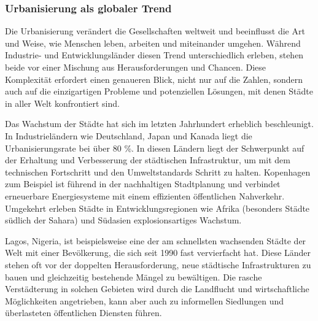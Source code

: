 \documentclass[conference,compsoc,final,a4paper, onecolumn, 11pt]{IEEEtran}
\begin{document}
\subsubsection{Urbanisierung als globaler Trend}
Die Urbanisierung verändert die Gesellschaften weltweit und beeinflusst die Art und Weise, wie Menschen leben, arbeiten und miteinander umgehen. 
Während Industrie- und Entwicklungsländer diesen Trend unterschiedlich erleben, stehen beide vor einer Mischung aus Herausforderungen und Chancen. 
Diese Komplexität erfordert einen genaueren Blick, nicht nur auf die Zahlen, sondern auch auf die einzigartigen Probleme und potenziellen Lösungen, mit denen Städte in aller Welt konfrontiert sind.

Das Wachstum der Städte hat sich im letzten Jahrhundert erheblich beschleunigt. 
In Industrieländern wie Deutschland, Japan und Kanada liegt die Urbanisierungsrate bei über 80 \%. 
In diesen Ländern liegt der Schwerpunkt auf der Erhaltung und Verbesserung der städtischen Infrastruktur, um mit dem technischen Fortschritt und den Umweltstandards Schritt zu halten. \autocite[S. 6ff]{taubenbock_globale_2015}
Kopenhagen zum Beispiel ist führend in der nachhaltigen Stadtplanung und verbindet erneuerbare Energiesysteme mit einem effizienten öffentlichen Nahverkehr. 
Umgekehrt erleben Städte in Entwicklungsregionen wie Afrika (besonders Städte südlich der Sahara) und Südasien explosionsartiges Wachstum. 

Lagos, Nigeria, ist beispielsweise eine der am schnellsten wachsenden Städte der Welt mit einer Bevölkerung, die sich seit 1990 fast vervierfacht hat. \autocite{aliyu_urbanization_2017}
Diese Länder stehen oft vor der doppelten Herausforderung, neue städtische Infrastrukturen zu bauen und gleichzeitig bestehende Mängel zu bewältigen. 
Die rasche Verstädterung in solchen Gebieten wird durch die Landflucht und wirtschaftliche Möglichkeiten angetrieben, kann aber auch zu informellen Siedlungen und überlasteten öffentlichen Diensten führen.
\end{document}
